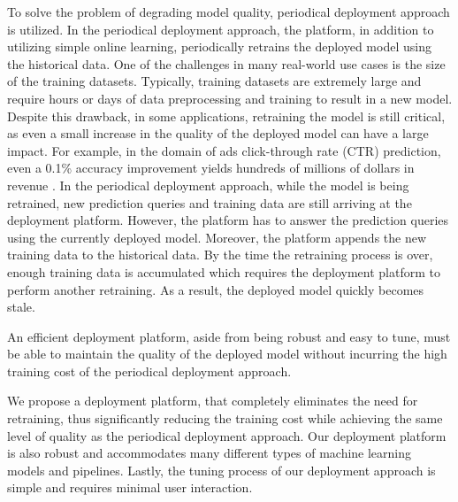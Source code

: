 To solve the problem of degrading model quality, periodical deployment approach is utilized.
In the periodical deployment approach, the platform, in addition to utilizing simple online learning, periodically retrains the deployed model using the historical data.
One of the challenges in many real-world use cases is the size of the training datasets.
Typically, training datasets are extremely large and require hours or days of data preprocessing and training to result in a new model.
Despite this drawback, in some applications, retraining the model is still critical, as even a small increase in the quality of the deployed model can have a large impact.
For example, in the domain of ads click-through rate (CTR) prediction, even a 0.1\% accuracy improvement yields hundreds of millions of dollars in revenue \cite{ling2017model}.
In the periodical deployment approach, while the model is being retrained, new prediction queries and training data are still arriving at the deployment platform.
However, the platform has to answer the prediction queries using the currently deployed model.
Moreover, the platform appends the new training data to the historical data.
By the time the retraining process is over, enough training data is accumulated which requires the deployment platform to perform another retraining.
As a result, the deployed model quickly becomes stale.

An efficient deployment platform, aside from being robust and easy to tune, must be able to maintain the quality of the deployed model without incurring the high training cost of the periodical deployment approach.
 
We propose a deployment platform, that completely eliminates the need for retraining, thus significantly reducing the training cost while achieving the same level of quality as the periodical deployment approach.
Our deployment platform is also robust and accommodates many different types of machine learning models and pipelines.
Lastly, the tuning process of our deployment approach is simple and requires minimal user interaction.



